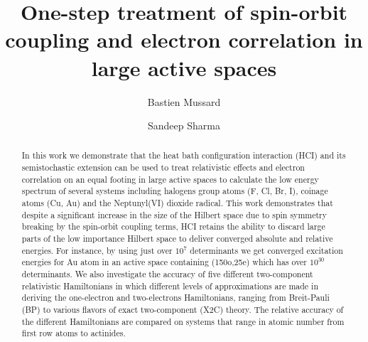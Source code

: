 \documentclass[10pt,aps,prb,twocolumn,amsmath,amssymb,superscriptaddress]{revtex4-1}
\begin{document}
\renewcommand{\arraystretch}{1.2}

\title{One-step treatment of spin-orbit coupling and electron correlation in large active spaces}
\author{Bastien Mussard}
\author{Sandeep Sharma}
\begin{abstract}
In this work we demonstrate that the heat bath configuration interaction (HCI) and its semistochastic extension can be used to treat relativistic effects and electron correlation on an equal footing in large active spaces to calculate the low energy spectrum of several systems including halogens group atoms (F, Cl, Br, I), coinage atoms (Cu, Au) and the Neptunyl(VI) dioxide radical. This work demonstrates that despite a significant increase in the size of the Hilbert space due to spin
symmetry breaking by the spin-orbit coupling terms, HCI retains the ability to discard large parts of the low importance Hilbert space to deliver converged absolute and relative energies. For instance, by using just over $10^7$ determinants we get converged excitation energies for Au atom in an active space containing (150o,25e) which has over $10^{30}$ determinants. We also investigate the accuracy of five different two-component relativistic Hamiltonians in which different levels of approximations are made in deriving the one-electron and two-electrons Hamiltonians, ranging from Breit-Pauli (BP) to various flavors of exact two-component (X2C) theory. The relative accuracy of the different Hamiltonians are compared on systems that range in atomic number from first row atoms to actinides. 
\end{abstract}
\maketitle
\end{document}
